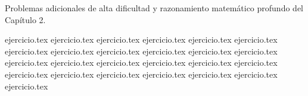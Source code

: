 
Problemas adicionales de alta dificultad y razonamiento matemático profundo del Capítulo 2.

\begin{enumerate}
    {ejercicio.tex}
    {ejercicio.tex}
    {ejercicio.tex}
    {ejercicio.tex}
    {ejercicio.tex}
    {ejercicio.tex}
    {ejercicio.tex}
    {ejercicio.tex}
    {ejercicio.tex}
    {ejercicio.tex}
    {ejercicio.tex}
    {ejercicio.tex}
    {ejercicio.tex}
    {ejercicio.tex}
    {ejercicio.tex}
    {ejercicio.tex}
    {ejercicio.tex}
    {ejercicio.tex}
    {ejercicio.tex}
    {ejercicio.tex}
    {ejercicio.tex}
    {ejercicio.tex}
    {ejercicio.tex}
    {ejercicio.tex}
    {ejercicio.tex}
\end{enumerate}
